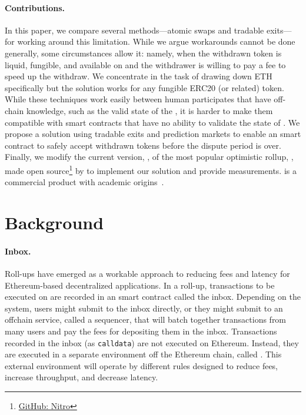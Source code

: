 \paragraph{Contributions.} In this paper, we compare several methods---atomic swaps and tradable exits---for working around this limitation. While we argue workarounds cannot be done generally, some circumstances allow it: namely, when the withdrawn token is liquid, fungible, and available on \layerone and the withdrawer is willing to pay a fee to speed up the withdraw. We concentrate in the task of drawing down ETH specifically but the solution works for any fungible ERC20 (or related) token. While these techniques work easily between human participates that have off-chain knowledge, such as the valid state of the \layertwo, it is harder to make them compatible with \layerone smart contracts that have no ability to validate the state of \layertwo. We propose a solution using tradable exits and prediction markets to enable an \layerone smart contract to safely accept withdrawn tokens before the dispute period is over. Finally, we modify the current version, \nitro, of the most popular optimistic rollup, \arb, made open source\footnote{\href{https://}{GitHub: Nitro}} by \offchain to implement our solution and provide measurements. \arb is a commercial product with academic origins~\cite{kalodner2018arbitrum}.
 

\section{Background} 

\paragraph{Inbox.} Roll-ups have emerged as a workable approach to reducing fees and latency for Ethereum-based decentralized applications. In a roll-up,  transactions to be executed on \layertwo are recorded in an \layerone smart contract called the inbox. Depending on the system, users might submit to the inbox directly, or they might submit to an offchain service, called a sequencer, that will batch together transactions from many users and pay the \layerone fees for depositing them in the inbox. Transactions recorded in the inbox (as \texttt{calldata}) are not executed on Ethereum. Instead, they are executed in a separate environment off the Ethereum chain, called \layertwo. This external environment will operate by different rules designed to reduce fees, increase throughput, and decrease latency. 

